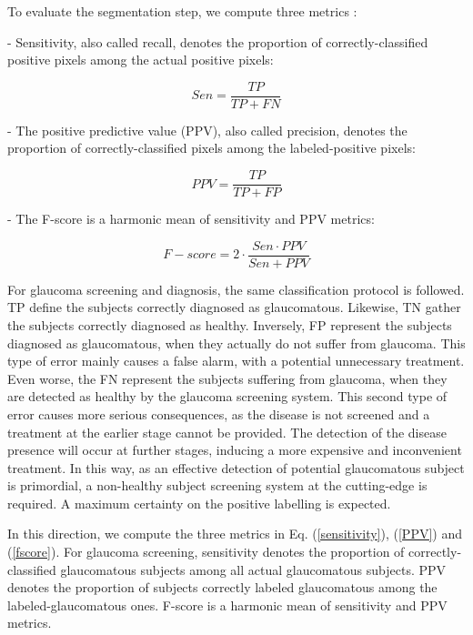 \bigbreak

To evaluate the segmentation step, we compute three metrics \citep{drishti}:

- Sensitivity, also called recall, denotes the proportion of correctly-classified positive pixels among the actual positive pixels:

\begin{equation}
Sen = \frac{TP}{TP+FN}
\label{sensitivity}
\end{equation}

\bigbreak

- The positive predictive value (PPV), also called precision, denotes the proportion of correctly-classified pixels among the labeled-positive pixels:

\begin{equation}
PPV = \frac{TP}{TP+FP}
\label{PPV}
\end{equation}

\bigbreak

- The F-score is a harmonic mean of sensitivity and PPV metrics:

\begin{equation}
F-score = 2 \cdot \frac{Sen \cdot PPV}{Sen + PPV}
\label{fscore}
\end{equation}

\vspace{0.5cm}

For glaucoma screening and diagnosis, the same classification protocol is followed. TP define the subjects correctly diagnosed as glaucomatous. Likewise, TN gather the subjects correctly diagnosed as healthy. Inversely, FP represent the subjects diagnosed as glaucomatous, when they actually do not suffer from glaucoma. This type of error mainly causes a false alarm, with a potential unnecessary treatment. Even worse, the FN represent the subjects suffering from glaucoma, when they are detected as healthy by the glaucoma screening system. This second type of error causes more serious consequences, as the disease is not screened and a treatment at the earlier stage cannot be provided. The detection of the disease presence will occur at further stages, inducing a more expensive and inconvenient treatment. In this way, as an effective detection of potential glaucomatous subject is primordial, a non-healthy subject screening system at the cutting-edge is required. A maximum certainty on the positive labelling is expected.

In this direction, we compute the three metrics in Eq. (\ref{sensitivity}), (\ref{PPV}) and (\ref{fscore}). For glaucoma screening, sensitivity denotes the proportion of correctly-classified glaucomatous subjects among all actual glaucomatous subjects.
PPV denotes the proportion of subjects correctly labeled glaucomatous among the labeled-glaucomatous ones. F-score is a harmonic mean of sensitivity and PPV metrics.


